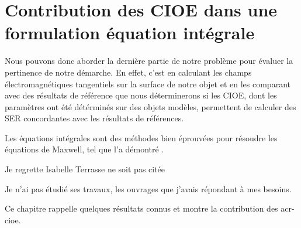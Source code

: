 \chapter{Contribution des CIOE dans une formulation équation intégrale}
\label{sec:equation_integrale}
\minitoc
\newpage
{}
Nous pouvons donc aborder la dernière partie de notre problème pour évaluer la pertinence de notre démarche.
En effet, c'est en calculant les champs électromagnétiques tangentiels sur la surface de notre objet et en les comparant avec des résultats de référence que nous déterminerons si les CIOE, dont les paramètres ont été détérminés sur des objets modèles, permettent de calculer des SER concordantes avec les résultats de références.

Les équations intégrales sont des méthodes bien éprouvées pour résoudre les équations de Maxwell, tel que l'a démontré \cite{nedelec_acoustic_2001}.
\begin{REM}
  Je regrette Isabelle Terrasse ne soit pas citée
\end{REM}
\begin{REP}
  Je n'ai pas étudié ses travaux, les ouvrages que j'avais répondant à mes besoins.
\end{REP}
Ce chapitre rappelle quelques résultats connus et montre la contribution des \gls{acr-cioe}.




